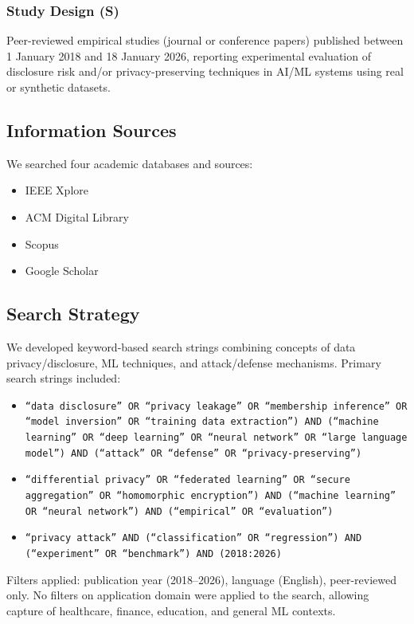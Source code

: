 \documentclass[11pt,a4paper]{article}
\begin{document}
\subsubsection{Study Design (S)}
Peer-reviewed empirical studies (journal or conference papers) published between 1 January 2018 and 18 January 2026, reporting experimental evaluation of disclosure risk and/or privacy-preserving techniques in AI/ML systems using real or synthetic datasets.

\subsection{Information Sources}

We searched four academic databases and sources:
\begin{itemize}
\item IEEE Xplore
\item ACM Digital Library
\item Scopus
\item Google Scholar
\end{itemize}

\subsection{Search Strategy}

We developed keyword-based search strings combining concepts of data privacy/disclosure, ML techniques, and attack/defense mechanisms. Primary search strings included:

\begin{itemize}
\item \texttt{``data disclosure'' OR ``privacy leakage'' OR ``membership inference'' OR ``model inversion'' OR ``training data extraction'') AND (``machine learning'' OR ``deep learning'' OR ``neural network'' OR ``large language model'') AND (``attack'' OR ``defense'' OR ``privacy-preserving'')}

\item \texttt{``differential privacy'' OR ``federated learning'' OR ``secure aggregation'' OR ``homomorphic encryption'') AND (``machine learning'' OR ``neural network'') AND (``empirical'' OR ``evaluation'')}

\item \texttt{``privacy attack'' AND (``classification'' OR ``regression'') AND (``experiment'' OR ``benchmark'') AND (2018:2026)}
\end{itemize}

Filters applied: publication year (2018–2026), language (English), peer-reviewed only. No filters on application domain were applied to the search, allowing capture of healthcare, finance, education, and general ML contexts.
\end{document}
